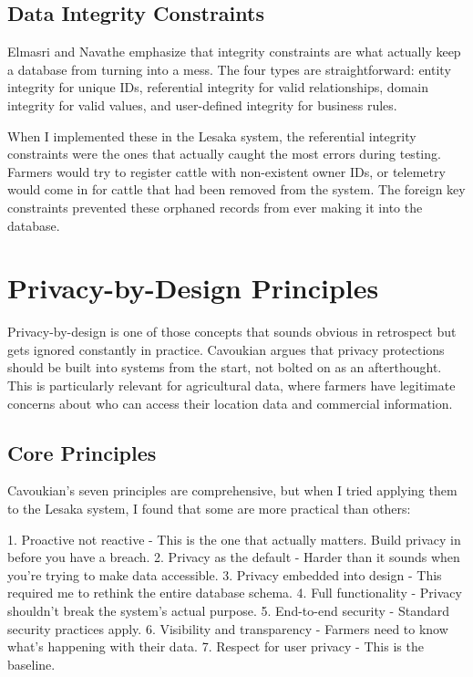 \subsection{Data Integrity Constraints}

Elmasri and Navathe \cite{navathe2020database} emphasize that integrity constraints are what actually keep a database from turning into a mess. The four types are straightforward: entity integrity for unique IDs, referential integrity for valid relationships, domain integrity for valid values, and user-defined integrity for business rules.

When I implemented these in the Lesaka system, the referential integrity constraints were the ones that actually caught the most errors during testing. Farmers would try to register cattle with non-existent owner IDs, or telemetry would come in for cattle that had been removed from the system. The foreign key constraints prevented these orphaned records from ever making it into the database.

\section{Privacy-by-Design Principles}

Privacy-by-design is one of those concepts that sounds obvious in retrospect but gets ignored constantly in practice. Cavoukian \cite{cavoukian2011privacy} argues that privacy protections should be built into systems from the start, not bolted on as an afterthought. This is particularly relevant for agricultural data, where farmers have legitimate concerns about who can access their location data and commercial information.

\subsection{Core Principles}

Cavoukian's seven principles are comprehensive, but when I tried applying them to the Lesaka system, I found that some are more practical than others:

1. Proactive not reactive - This is the one that actually matters. Build privacy in before you have a breach.
2. Privacy as the default - Harder than it sounds when you're trying to make data accessible.
3. Privacy embedded into design - This required me to rethink the entire database schema.
4. Full functionality - Privacy shouldn't break the system's actual purpose.
5. End-to-end security - Standard security practices apply.
6. Visibility and transparency - Farmers need to know what's happening with their data.
7. Respect for user privacy - This is the baseline.

